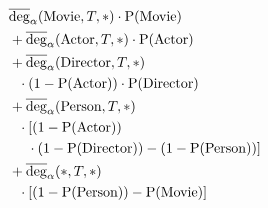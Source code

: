 $\!\begin{aligned}
  &\avgdeg_\alpha(\text{Movie}, T, *) \cdot \sprob(\text{Movie}) \\
  &+ \avgdeg_\alpha(\text{Actor}, T, *) \cdot \sprob(\text{Actor}) \\
  &+ \avgdeg_\alpha(\text{Director}, T, *) \\
  &~~\cdot (1 - \sprob(\text{Actor})) \cdot \sprob(\text{Director}) \\
  &+ \avgdeg_\alpha(\text{Person}, T, *) \\
  &~~\cdot [(1 - \sprob(\text{Actor})) \\
  &~~~~\cdot (1 - \sprob(\text{Director})) - (1 - \sprob(\text{Person}))] \\
  &+ \avgdeg_\alpha(*, T, *) \\
  &~~\cdot [(1 - \sprob(\text{Person})) - \sprob(\text{Movie})]
\end{aligned}$
